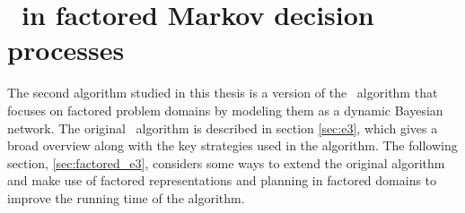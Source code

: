\section{\etre\ in factored Markov decision processes}
\label{sec:fac_e3}

The second algorithm studied in this thesis is a version of the \etre\ algorithm that focuses on factored problem domains by modeling them as a dynamic Bayesian network. The original \etre\ algorithm is described in section \ref{sec:e3}, which gives a broad overview along with the key strategies used in the algorithm. The following section, \ref{sec:factored_e3}, considers some ways to extend the original algorithm and make use of factored representations and planning in factored domains to improve the running time of the algorithm.



